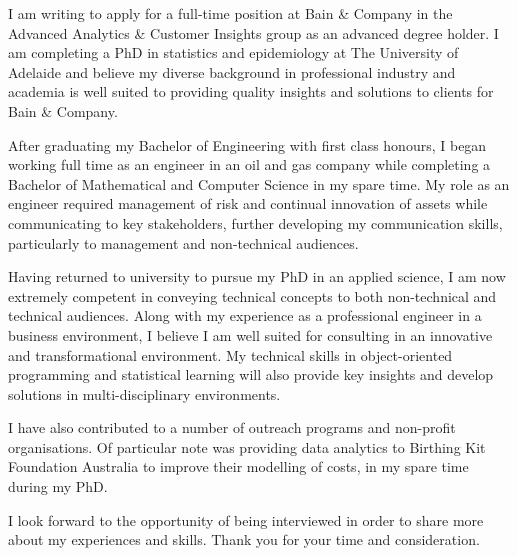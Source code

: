 \documentclass[10pt,stdletter,dateno,sigleft]{newlfm} %
\begin{document}
\begin{newlfm}


I am writing to apply for a full-time position at Bain \& Company in the  Advanced Analytics \& Customer Insights group as an advanced degree holder. I am completing a PhD in statistics and epidemiology at The University of Adelaide and believe my diverse background in professional industry and academia is well suited to providing quality insights and solutions to clients for Bain \& Company.

 After graduating my Bachelor of Engineering with first class honours, I began working full time as an engineer in an oil and gas company while completing a Bachelor of Mathematical and Computer Science in my spare time. My role as an engineer required management of risk and continual innovation of assets while communicating to key stakeholders, further developing my communication skills, particularly to management and non-technical audiences. 

Having returned to university to pursue my PhD in an applied science, I am now extremely competent in conveying technical concepts to both non-technical and technical audiences. Along with my experience as a professional engineer in a business environment, I believe I am well suited for consulting in an innovative and transformational environment. My technical skills in object-oriented programming and statistical learning will also provide key insights and develop solutions in multi-disciplinary environments.

I have also contributed to a number of outreach programs and non-profit organisations. Of particular note was providing data analytics to Birthing Kit Foundation Australia to improve their modelling of costs, in my spare time during my PhD.

I look forward to the opportunity of being interviewed in order to share more about my experiences and skills. Thank you for your time and consideration.


\end{newlfm}
\end{document}
